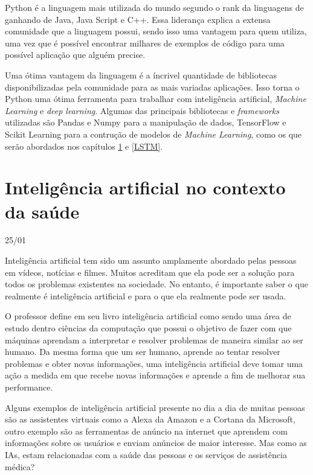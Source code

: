 \documentclass[
  12pt,		%
  a4paper,	%
  openright,%
  oneside,	%
  chapter=TITLE,		%
  section=TITLE,		%
  english,	%
  french,	%
  spanish,	%
  brazil	%
]{abntex2}
\begin{document}
    Python é a linguagem mais utilizada do mundo segundo o rank da linguagens de \cite[]{PYPL} ganhando de Java, Java Script e C++. Essa liderança
    explica a extensa comunidade que a linguagem possui, sendo isso uma vantagem para quem utiliza, uma vez que é possível encontrar milhares
    de exemplos de código para uma possível aplicação que alguém precise.
    
    Uma ótima vantagem da linguagem é a íncrivel quantidade de bibliotecas disponibilizadas pela comunidade para as mais variadas aplicações. Isso
    torna o Python uma ótima ferramenta para trabalhar com inteligência artificial, \textit{Machine Learning} e \textit{deep learning}. Algumas das principais
    bibliotecas e \textit{frameworks} utilizadas são Pandas e Numpy para a manipulação de dados, TensorFlow e Scikit Learning para
    a contrução de modelos de \textit{Machine Learning}, como os que serão abordados nos capítulos \ref*{IA} e \ref*{LSTM}.
    
    \section{Inteligência artificial no contexto da saúde}
    \label{IA}
    25/01

    Inteligência artificial tem sido um assunto amplamente abordado pelas pessoas em vídeos, notícias e filmes. Muitos
    acreditam que ela pode ser a solução para todos os problemas existentes na sociedade. No entanto, é importante
    saber o que realmente é inteligência artificial e para o que ela realmente pode ser usada.

    O professor \cite[]{IA_python} define em seu livro inteligência artificial como sendo uma área de estudo dentro ciências da computação
    que possui o objetivo de fazer com que máquinas aprendam a interpretar e resolver problemas de maneira similar
    ao ser humano. Da mesma forma que um ser humano, aprende ao tentar resolver problemas e obter novas informações, uma inteligência artificial
    deve tomar uma ação a medida em que recebe novas informações e aprende a fim de melhorar sua performance.

    Alguns exemplos de inteligência artificial presente no dia a dia de muitas pessoas são as assistentes virtuais
    como a Alexa da Amazon e a Cortana da Microsoft, outro exemplo são as ferramentas de anúncio na internet que aprendem
    com informações sobre os usuários e enviam anúncios de maior interesse. Mas como as IAs, estam relacionadas 
    com a saúde das pessoas e os serviços de assistência médica?
    
\end{document}
